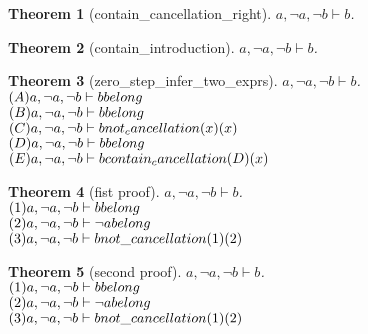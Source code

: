 \documentclass[11pt]{article}
\newtheorem{theorem}{Theorem}
\def\turn{\vdash}
\begin{document}
\begin{theorem}[contain_cancellation_right] $ a, \neg a, \neg b \turn b $.\\
\end{theorem}
\begin{theorem}[contain_introduction] $ a, \neg a, \neg b \turn b $.\\
\end{theorem}
\begin{theorem}[zero_step_infer_two_exprs] $ a, \neg a, \neg b \turn b $.\\
$(A)a, \neg a, \neg b \turn b \hfill belong  $\\
$(B)a, \neg a, \neg b \turn b \hfill belong  $\\
$(C)a, \neg a, \neg b \turn b \hfill not_cancellation (x)(x) $\\
$(D)a, \neg a, \neg b \turn b \hfill belong  $\\
$(E)a, \neg a, \neg b \turn b \hfill contain_cancellation (D)(x) $\\
\end{theorem}
\begin{theorem}[fist proof] $ a, \neg a, \neg b \turn b $.\\
$(1)a, \neg a, \neg b \turn b \hfill belong $\\
$(2)a, \neg a, \neg b \turn \neg a \hfill belong $\\
$(3)a, \neg a, \neg b \turn b \hfill not \_ cancellation (1)(2) $\\
\end{theorem}
\begin{theorem}[second proof] $ a, \neg a, \neg b \turn b $.\\
$(1)a, \neg a, \neg b \turn b \hfill belong $\\
$(2)a, \neg a, \neg b \turn \neg a \hfill belong $\\
$(3)a, \neg a, \neg b \turn b \hfill not \_ cancellation (1)(2) $\\
\end{theorem}
\end{document}
